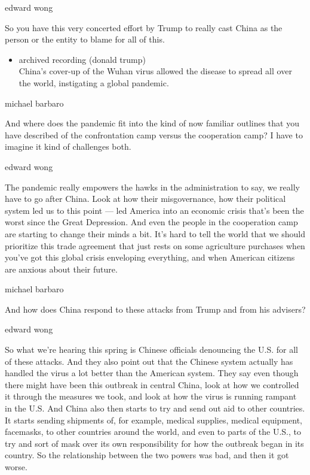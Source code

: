 edward wong

So you have this very concerted effort by Trump to really cast China as
the person or the entity to blame for all of this.

\begin{itemize}
\tightlist
\item
  archived recording (donald trump)\\
  China's cover-up of the Wuhan virus allowed the disease to spread all
  over the world, instigating a global pandemic.
\end{itemize}

michael barbaro

And where does the pandemic fit into the kind of now familiar outlines
that you have described of the confrontation camp versus the cooperation
camp? I have to imagine it kind of challenges both.

edward wong

The pandemic really empowers the hawks in the administration to say, we
really have to go after China. Look at how their misgovernance, how
their political system led us to this point --- led America into an
economic crisis that's been the worst since the Great Depression. And
even the people in the cooperation camp are starting to change their
minds a bit. It's hard to tell the world that we should prioritize this
trade agreement that just rests on some agriculture purchases when
you've got this global crisis enveloping everything, and when American
citizens are anxious about their future.

michael barbaro

And how does China respond to these attacks from Trump and from his
advisers?

edward wong

So what we're hearing this spring is Chinese officials denouncing the
U.S. for all of these attacks. And they also point out that the Chinese
system actually has handled the virus a lot better than the American
system. They say even though there might have been this outbreak in
central China, look at how we controlled it through the measures we
took, and look at how the virus is running rampant in the U.S. And China
also then starts to try and send out aid to other countries. It starts
sending shipments of, for example, medical supplies, medical equipment,
facemasks, to other countries around the world, and even to parts of the
U.S., to try and sort of mask over its own responsibility for how the
outbreak began in its country. So the relationship between the two
powers was bad, and then it got worse.

